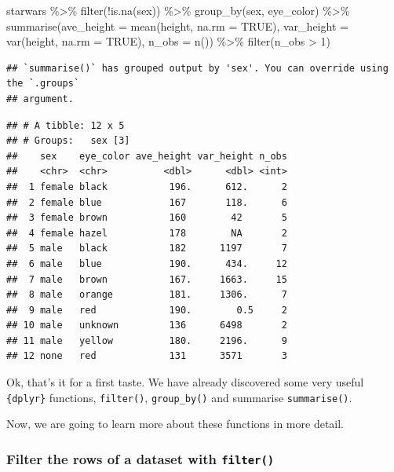 \documentclass[
]{article}
\newenvironment{Shaded}{\begin{snugshade}}{\end{snugshade}}
\newcommand{\AttributeTok}[1]{\textcolor[rgb]{0.77,0.63,0.00}{#1}}
\newcommand{\ConstantTok}[1]{\textcolor[rgb]{0.00,0.00,0.00}{#1}}
\newcommand{\DecValTok}[1]{\textcolor[rgb]{0.00,0.00,0.81}{#1}}
\newcommand{\FunctionTok}[1]{\textcolor[rgb]{0.00,0.00,0.00}{#1}}
\newcommand{\NormalTok}[1]{#1}
\newcommand{\SpecialCharTok}[1]{\textcolor[rgb]{0.00,0.00,0.00}{#1}}
\begin{document}
\begin{Shaded}
\begin{Highlighting}[]
\NormalTok{starwars }\SpecialCharTok{\%\textgreater{}\%}
  \FunctionTok{filter}\NormalTok{(}\SpecialCharTok{!}\FunctionTok{is.na}\NormalTok{(sex)) }\SpecialCharTok{\%\textgreater{}\%}
  \FunctionTok{group\_by}\NormalTok{(sex, eye\_color) }\SpecialCharTok{\%\textgreater{}\%}
  \FunctionTok{summarise}\NormalTok{(}\AttributeTok{ave\_height =} \FunctionTok{mean}\NormalTok{(height, }\AttributeTok{na.rm =} \ConstantTok{TRUE}\NormalTok{),}
            \AttributeTok{var\_height =} \FunctionTok{var}\NormalTok{(height, }\AttributeTok{na.rm =} \ConstantTok{TRUE}\NormalTok{),}
            \AttributeTok{n\_obs =} \FunctionTok{n}\NormalTok{()) }\SpecialCharTok{\%\textgreater{}\%}
  \FunctionTok{filter}\NormalTok{(n\_obs }\SpecialCharTok{\textgreater{}} \DecValTok{1}\NormalTok{)}
\end{Highlighting}
\end{Shaded}

\begin{verbatim}
## `summarise()` has grouped output by 'sex'. You can override using the `.groups`
## argument.
\end{verbatim}

\begin{verbatim}
## # A tibble: 12 x 5
## # Groups:   sex [3]
##    sex    eye_color ave_height var_height n_obs
##    <chr>  <chr>          <dbl>      <dbl> <int>
##  1 female black           196.      612.      2
##  2 female blue            167       118.      6
##  3 female brown           160        42       5
##  4 female hazel           178        NA       2
##  5 male   black           182      1197       7
##  6 male   blue            190.      434.     12
##  7 male   brown           167.     1663.     15
##  8 male   orange          181.     1306.      7
##  9 male   red             190.        0.5     2
## 10 male   unknown         136      6498       2
## 11 male   yellow          180.     2196.      9
## 12 none   red             131      3571       3
\end{verbatim}

Ok, that's it for a first taste. We have already discovered some very useful \texttt{\{dplyr\}} functions,
\texttt{filter()}, \texttt{group\_by()} and summarise \texttt{summarise()}.

Now, we are going to learn more about these functions in more detail.

\hypertarget{filter-the-rows-of-a-dataset-with-filter}{%
\subsubsection{\texorpdfstring{Filter the rows of a dataset with \texttt{filter()}}{Filter the rows of a dataset with filter()}}\label{filter-the-rows-of-a-dataset-with-filter}}
\end{document}

